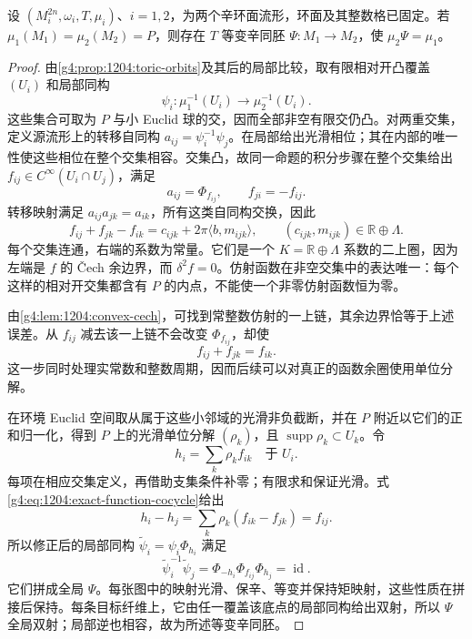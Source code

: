 \begin{theorem}\label{g4:thm:1204:uniqueness}
	设 \((M_i^{2n},\omega_i,T,\mu_i)\)、\(i=1,2\)，为两个辛环面流形，环面及其整数格已固定。若 \(\mu_1(M_1)=\mu_2(M_2)=P\)，则存在 \(T\) 等变辛同胚 \(\Psi:M_1\to M_2\)，使 \(\mu_2\Psi=\mu_1\)。
\end{theorem}
\begin{proof}
	由\cref{g4:prop:1204:toric-orbits}及其后的局部比较，取有限相对开凸覆盖 \((U_i)\) 和局部同构
	\[
		\psi_i:\mu_1^{-1}(U_i)\longrightarrow\mu_2^{-1}(U_i).
	\]
	这些集合可取为 \(P\) 与小 Euclid 球的交，因而全部非空有限交仍凸。对两重交集，定义源流形上的转移自同构 \(a_{ij}=\psi_i^{-1}\psi_j\)。在局部给出光滑相位；其在内部的唯一性使这些相位在整个交集相容。交集凸，故同一命题的积分步骤在整个交集给出 \(f_{ij}\in C^\infty(U_i\cap U_j)\)，满足
	\[
		a_{ij}=\Phi_{f_{ij}},\qquad f_{ji}=-f_{ij}.
	\]
	转移映射满足 \(a_{ij}a_{jk}=a_{ik}\)，所有这类自同构交换，因此
	\[
		f_{ij}+f_{jk}-f_{ik}
		=c_{ijk}+2\pi\langle b,m_{ijk}\rangle,
		\qquad (c_{ijk},m_{ijk})\in\mathbb R\oplus\Lambda.
	\]
	每个交集连通，右端的系数为常量。它们是一个 \(K=\mathbb R\oplus\Lambda\) 系数的二上圈，因为左端是 \(f\) 的 Čech 余边界，而 \(\delta^2f=0\)。仿射函数在非空交集中的表达唯一：每个这样的相对开交集都含有 \(P\) 的内点，不能使一个非零仿射函数恒为零。

	由\cref{g4:lem:1204:convex-cech}，可找到常整数仿射的一上链，其余边界恰等于上述误差。从 \(f_{ij}\) 减去该一上链不会改变 \(\Phi_{f_{ij}}\)，却使
	\begin{equation}\label{g4:eq:1204:exact-function-cocycle}
		f_{ij}+f_{jk}=f_{ik}.
	\end{equation}
	这一步同时处理实常数和整数周期，因而后续可以对真正的函数余圈使用单位分解。

	在环境 Euclid 空间取从属于这些小邻域的光滑非负截断，并在 \(P\) 附近以它们的正和归一化，得到 \(P\) 上的光滑单位分解 \((\rho_k)\)，且 \(\operatorname{supp}\rho_k\subset U_k\)。令
	\[
		h_i=\sum_k\rho_k f_{ik}\quad\text{于 }U_i.
	\]
	每项在相应交集定义，再借助支集条件补零；有限求和保证光滑。式\eqref{g4:eq:1204:exact-function-cocycle}给出
	\[
		h_i-h_j=\sum_k\rho_k(f_{ik}-f_{jk})=f_{ij}.
	\]
	所以修正后的局部同构 \(\widetilde\psi_i=\psi_i\Phi_{h_i}\) 满足
	\[
		\widetilde\psi_i^{-1}\widetilde\psi_j
		=\Phi_{-h_i}\Phi_{f_{ij}}\Phi_{h_j}=\operatorname{id}.
	\]
	它们拼成全局 \(\Psi\)。每张图中的映射光滑、保辛、等变并保持矩映射，这些性质在拼接后保持。每条目标纤维上，它由任一覆盖该底点的局部同构给出双射，所以 \(\Psi\) 全局双射；局部逆也相容，故为所述等变辛同胚。
\end{proof}

